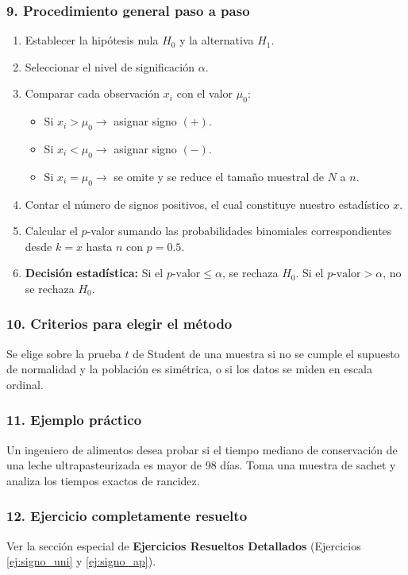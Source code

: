 \documentclass[11pt,a4paper]{article}
\begin{document}
\subsubsection{9. Procedimiento general paso a paso}
\begin{enumerate}
    \item Establecer la hipótesis nula $H_0$ y la alternativa $H_1$.
    \item Seleccionar el nivel de significación $\alpha$.
    \item Comparar cada observación $x_i$ con el valor $\mu_0$:
    \begin{itemize}
        \item Si $x_i > \mu_0 \rightarrow$ asignar signo $(+)$.
        \item Si $x_i < \mu_0 \rightarrow$ asignar signo $(-)$.
        \item Si $x_i = \mu_0 \rightarrow$ se omite y se reduce el tamaño muestral de $N$ a $n$.
    \end{itemize}
    \item Contar el número de signos positivos, el cual constituye nuestro estadístico $x$.
    \item Calcular el $p$-valor sumando las probabilidades binomiales correspondientes desde $k=x$ hasta $n$ con $p=0.5$.
    \item \textbf{Decisión estadística:} Si el $p\text{-valor} \le \alpha$, se rechaza $H_0$. Si el $p\text{-valor} > \alpha$, no se rechaza $H_0$.
\end{enumerate}

\subsubsection{10. Criterios para elegir el método}
Se elige sobre la prueba $t$ de Student de una muestra si no se cumple el supuesto de normalidad y la población es simétrica, o si los datos se miden en escala ordinal.

\subsubsection{11. Ejemplo práctico}
Un ingeniero de alimentos desea probar si el tiempo mediano de conservación de una leche ultrapasteurizada es mayor de 98 días. Toma una muestra de sachet y analiza los tiempos exactos de rancidez.

\subsubsection{12. Ejercicio completamente resuelto}
Ver la sección especial de \textbf{Ejercicios Resueltos Detallados} (Ejercicios \ref{ej:signo_uni} y \ref{ej:signo_ap}).
\end{document}
